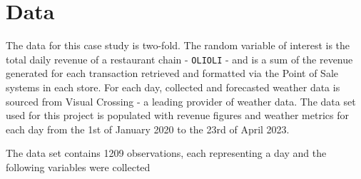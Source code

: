 \section{Data}


The data for this case study is two-fold. The random variable of interest is
the total daily revenue of a restaurant chain - \texttt{OLIOLI} - and is a sum
of the revenue generated for each transaction retrieved and formatted via the
Point of Sale systems in each store. For each day, collected and forecasted
weather data is sourced from Visual Crossing - a leading provider of weather
data. The data set used for this project is populated with revenue figures and
weather metrics for each day from the 1st of January 2020 to the 23rd of April
2023.

The data set contains 1209 observations, each representing a day and the following variables were collected

